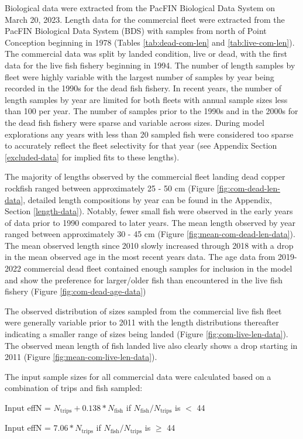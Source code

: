 \documentclass[11pt,
  letterpaper,
]{article}
\begin{document}
Biological data were extracted from the PacFIN Biological Data System on March 20, 2023. Length data for the commercial fleet were extracted from the PacFIN Biological Data System (BDS) with samples from north of Point Conception beginning in 1978 (Tables \ref{tab:dead-com-len} and \ref{tab:live-com-len}). The commercial data was split by landed condition, live or dead, with the first data for the live fish fishery beginning in 1994. The number of length samples by fleet were highly variable with the largest number of samples by year being recorded in the 1990s for the dead fish fishery. In recent years, the number of length samples by year are limited for both fleets with annual sample sizes less than 100 per year. The number of samples prior to the 1990s and in the 2000s for the dead fish fishery were sparse and variable across sizes. During model explorations any years with less than 20 sampled fish were considered too sparse to accurately reflect the fleet selectivity for that year (see Appendix Section \ref{excluded-data} for implied fits to these lengths).

The majority of lengths observed by the commercial fleet landing dead copper rockfish ranged between approximately 25 - 50 cm (Figure \ref{fig:com-dead-len-data}, detailed length compositions by year can be found in the Appendix, Section \ref{length-data}). Notably, fewer small fish were observed in the early years of data prior to 1990 compared to later years. The mean length observed by year ranged between approximately 30 - 45 cm (Figure \ref{fig:mean-com-dead-len-data}). The mean observed length since 2010 slowly increased through 2018 with a drop in the mean observed age in the most recent years data. The age data from 2019-2022 commercial dead fleet contained enough samples for inclusion in the model and show the preference for larger/older fish than encountered in the live fish fishery (Figure \ref{fig:com-dead-age-data})

The observed distribution of sizes sampled from the commercial live fish fleet were generally variable prior to 2011 with the length distributions thereafter indicating a smaller range of sizes being landed (Figure \ref{fig:com-live-len-data}). The observed mean length of fish landed live also clearly shows a drop starting in 2011 (Figure \ref{fig:mean-com-live-len-data}).

The input sample sizes for all commercial data were calculated based on a combination of trips and fish sampled:

\begin{centering}

Input effN = $N_{\text{trips}} + 0.138 * N_{\text{fish}}$ if $N_{\text{fish}}/N_{\text{trips}}$ is $<$ 44

Input effN = $7.06 * N_{\text{trips}}$ if $N_{\text{fish}}/N_{\text{trips}}$ is $\geq$ 44

\end{centering}
\end{document}
